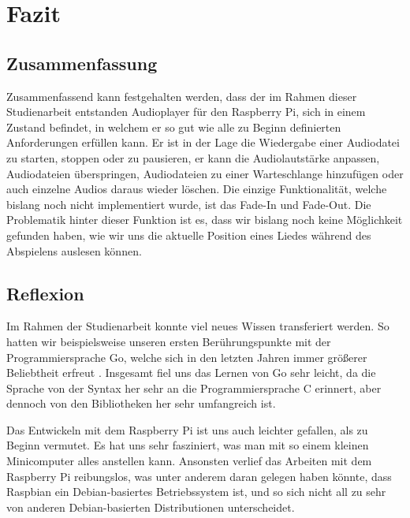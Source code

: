 
\chapter{Fazit}

\section{Zusammenfassung}
Zusammenfassend kann festgehalten werden, dass der im Rahmen dieser
Studienarbeit entstanden Audioplayer für den Raspberry Pi, sich in einem
Zustand befindet, in welchem er so gut wie alle zu Beginn definierten
Anforderungen erfüllen kann. Er ist in der Lage die Wiedergabe einer Audiodatei zu starten, stoppen oder
zu pausieren, er kann die Audiolautstärke anpassen, Audiodateien überspringen, Audiodateien
zu einer Warteschlange hinzufügen oder auch einzelne Audios daraus wieder löschen. Die
einzige Funktionalität, welche bislang noch nicht implementiert wurde, ist das
Fade-In und Fade-Out. Die Problematik hinter dieser Funktion ist
es, dass wir bislang noch keine Möglichkeit gefunden haben, wie wir uns die
aktuelle Position eines Liedes während des Abspielens auslesen können. 


\section{Reflexion}
Im Rahmen der Studienarbeit konnte viel neues Wissen transferiert werden. So
hatten wir beispielsweise unseren ersten Berührungspunkte mit der
Programmiersprache Go, welche sich in den letzten Jahren immer größerer
Beliebtheit erfreut \autocite{stack_overflow_2019}.
Insgesamt fiel uns das Lernen von Go sehr leicht, da die Sprache von der Syntax
her sehr an die Programmiersprache C erinnert, aber dennoch von den Bibliotheken her sehr umfangreich
ist. \newline

Das Entwickeln mit dem Raspberry Pi ist uns auch leichter gefallen, als zu
Beginn vermutet. Es hat uns sehr fasziniert, was man mit so einem kleinen
Minicomputer alles anstellen kann. Ansonsten verlief das Arbeiten mit dem
Raspberry Pi reibungslos, was unter anderem daran gelegen haben könnte, dass
Raspbian ein Debian-basiertes Betriebssystem ist, und so sich nicht all zu sehr
von anderen Debian-basierten Distributionen unterscheidet.  \newline

